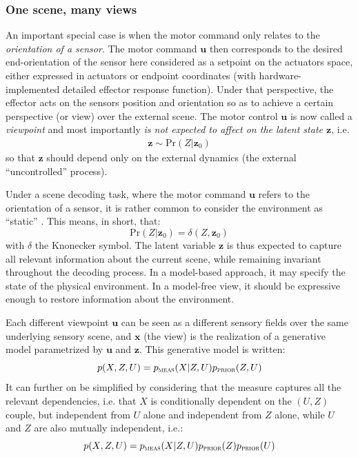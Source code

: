 \documentclass[12pt,twoside,openright]{article}
\begin{document}
\subsubsection{One scene, many views}
An important special case is when the motor command only relates to the \emph{orientation of a sensor}. The motor command $\boldsymbol{u}$ then corresponds to the desired end-orientation of the sensor here considered as a setpoint on the actuators space, either expressed in actuators or endpoint coordinates (with hardware-implemented detailed effector response function).  
Under that perspective, the effector acts on the sensors position and orientation so as to achieve a certain perspective (or view) over the external scene. The motor control $\boldsymbol{u}$ is now called a \emph{viewpoint} and most importantly \emph{is not expected to affect on the latent state $\boldsymbol{z}$}, i.e.
\begin{align}
\boldsymbol{z} \sim \text{Pr}(Z|\boldsymbol{z}_0)
\end{align} 
so that $\boldsymbol{z}$ should depend only on the external dynamics (the external ``uncontrolled'' process).


Under a scene decoding  task, where the motor command $\boldsymbol{u}$ refers to the orientation of a sensor, it is rather common to consider the environment as ``static'' \cite{butko2010infomax}. This means, in short, that:
$$\text{Pr}(Z|\boldsymbol{z}_0) = \delta(Z, \boldsymbol{z}_0)$$ 
with $\delta$ the Knonecker symbol. 
The latent variable $\boldsymbol{z}$ is thus expected to capture all relevant information about the current scene, while remaining invariant throughout the decoding process. In a model-based approach, it may specify the state of the physical environment. In a model-free view, it should be expressive enough to restore information about the environment.  

Each different viewpoint $\boldsymbol{u}$ can be seen as a different sensory fields over the same underlying sensory scene, and $\boldsymbol{x}$ (the view) is the realization of a generative model parametrized by $\boldsymbol{u}$ and $\boldsymbol{z}$. This generative model is written:
$$p(X, Z, U) = p_\text{\sc meas}(X| Z, U)p_\text{\sc prior}(Z, U)$$
It can further on be simplified by considering that the measure captures all the relevant dependencies, i.e. that $X$ is conditionally dependent on the $(U,Z)$ couple, but independent from $U$ alone and independent from $Z$ alone, while $U$ and $Z$ are also mutually independent, i.e.:
$$p(X, Z, U) = p_\text{\sc meas}(X| Z, U)p_\text{\sc prior}(Z) p_\text{\sc prior}(U)$$
\end{document}

